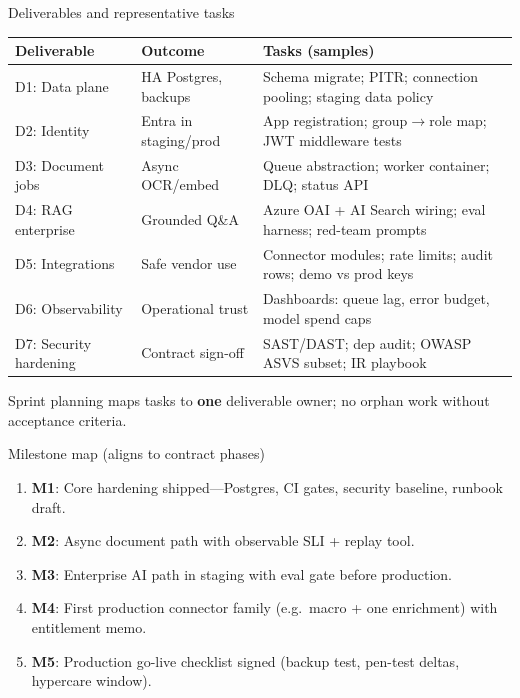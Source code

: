 \documentclass[aspectratio=169,11pt]{beamer}
\begin{document}
\begin{frame}{Deliverables and representative tasks}
  \tiny
  \begin{tabular}{p{2.45cm}p{4.7cm}p{5.8cm}}
    \textbf{Deliverable} & \textbf{Outcome} & \textbf{Tasks (samples)} \\
    \hline
    D1: Data plane & HA Postgres, backups & Schema migrate; PITR; connection pooling; staging data policy \\
    D2: Identity & Entra in staging/prod & App registration; group$\rightarrow$role map; JWT middleware tests \\
    D3: Document jobs & Async OCR/embed & Queue abstraction; worker container; DLQ; status API \\
    D4: RAG enterprise & Grounded Q\&A & Azure OAI + AI Search wiring; eval harness; red-team prompts \\
    D5: Integrations & Safe vendor use & Connector modules; rate limits; audit rows; demo vs prod keys \\
    D6: Observability & Operational trust & Dashboards: queue lag, error budget, model spend caps \\
    D7: Security hardening & Contract sign-off & SAST/DAST; dep audit; OWASP ASVS subset; IR playbook \\
  \end{tabular}

  \vspace{0.35em}
  \normalsize
  Sprint planning maps tasks to \textbf{one} deliverable owner; no orphan work without acceptance criteria.
\end{frame}

\begin{frame}{Milestone map (aligns to contract phases)}
  \small
  \begin{enumerate}\itemsep3pt
    \item \textbf{M1}: Core hardening shipped---Postgres, CI gates, security baseline, runbook draft.
    \item \textbf{M2}: Async document path with observable SLI + replay tool.
    \item \textbf{M3}: Enterprise AI path in staging with eval gate before production.
    \item \textbf{M4}: First production connector family (e.g.\ macro + one enrichment) with entitlement memo.
    \item \textbf{M5}: Production go-live checklist signed (backup test, pen-test deltas, hypercare window).
  \end{enumerate}
\end{frame}
\end{document}
